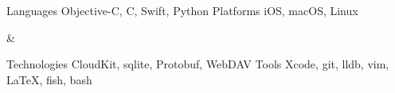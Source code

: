 

\begin{cvskills}
\begin{cvskillgroup}
\cvskill
	{Languages}
	{Objective-C, C, Swift, Python}
\cvskill
	{Platforms}
	{iOS, macOS, Linux}
\end{cvskillgroup} &
\begin{cvskillgroup}
\cvskill
	{Technologies}
	{CloudKit, sqlite, Protobuf, WebDAV}
\cvskill
	{Tools}
	{Xcode, git, lldb, vim, \LaTeX{}, fish, bash}
\end{cvskillgroup}
\end{cvskills}
